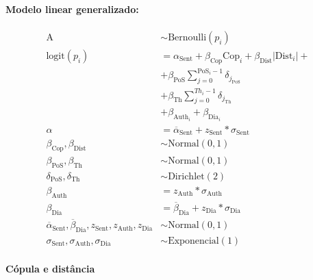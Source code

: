 \documentclass[a4paper, 12pt, article]{memoir}
\newcommand{\Bernoulli}{\text{Bernoulli}}
\newcommand{\Normal}{\text{Normal}}
\newcommand{\Dirichlet}{\text{Dirichlet}}
\newcommand{\Exponencial}{\text{Exponencial}}
\newcommand{\logit}{\text{logit}}
\newcommand{\Dist}{\text{Dist}}
\newcommand{\Cop}{\text{Cop}}
\newcommand{\Sent}{\text{Sent}}
\newcommand{\Auth}{\text{Auth}}
\newcommand{\PoS}{\text{PoS}}
\newcommand{\Th}{\text{Th}}
\newcommand{\Dia}{\text{Dia}}
\newcommand{\abar}{\overline{\alpha}}
\newcommand{\bbar}{\overline{\beta}}
\newcommand{\bv}[1]{\beta_\text{#1}}
\newcommand{\bvi}[1]{\beta_{\text{#1}_i}}
\begin{document}
\paragraph{Modelo linear generalizado:}
\begin{align*}
  \text{A}                                                & \sim \Bernoulli(p_i)                                     \\
  \logit(p_i)                                             & = \alpha_{\Sent} + \bv{Cop}\Cop_i + \bv{Dist}|\Dist_i| + \\
                                                          & + \bv{PoS}\sum^{\PoS_{i}-1}_{j=0}{\delta_{j_{\PoS}}}     \\
                                                          & + \bv{Th}\sum^{Th_{i}-1}_{j=0}{\delta_{j_{\Th}}}         \\
                                                          & + \bvi{Auth} + \bvi{Dia}                                 \\
  \alpha                                                  & = \abar_\Sent + z_{\Sent} * \sigma_\Sent                 \\
  \bv{Cop}, \bv{Dist}                                     & \sim \Normal(0, 1)                                       \\
  \bv{PoS}, \bv{Th}                                       & \sim \Normal(0, 1)                                       \\
  \delta_{\PoS}, \delta_{\Th}                             & \sim \Dirichlet(2)                                       \\
  \bv{Auth}                                               & = z_{\Auth}*\sigma_{\Auth}                               \\
  \bv{Dia}                                                & = \bbar_\Dia + z_{\Dia}*\sigma_{\Dia}                    \\
  \abar_\Sent, \bbar_\Dia, z_{\Sent}, z_{\Auth}, z_{\Dia} & \sim \Normal(0,1)                                        \\
  \sigma_{\Sent}, \sigma_{\Auth}, \sigma_{\Dia}           & \sim \Exponencial(1)
\end{align*}

\paragraph{Cópula e distância} %

\begin{center}
  
\end{center}
\end{document}
